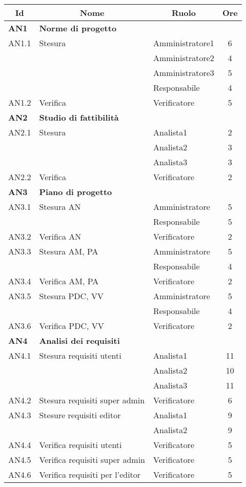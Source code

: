 \begin{table}[H]
	\centering
	\begin{tabular}{ l l l c  }
	\hline
	\multicolumn{1}{c}{\textbf{Id}} & 
	\multicolumn{1}{c}{\textbf{Nome}} & 
	\multicolumn{1}{c}{\textbf{Ruolo}}& 
	\multicolumn{1}{c}{\textbf{Ore}} \\
	\hline
	
	\textbf{AN1} & \textbf{Norme di progetto} \\
	\cline{3-4}
	AN1.1 & Stesura & Amministratore1 & 6\\ 
    & & Amministratore2 & 4\\
    & & Amministratore3 & 5 \\
    & & Responsabile & 4 \\
    \cline{3-4}
	AN1.2 & Verifica & Verificatore &  5\\
	
	\hline
	\textbf{AN2} & \textbf{Studio di fattibilità} \\
	\cline{3-4}
	AN2.1 & Stesura & Analista1 & 2\\ 
    & & Analista2 & 3\\
    & & Analista3 & 3 \\
    \cline{3-4}
	AN2.2 & Verifica & Verificatore &  2\\
	
	\hline
	\textbf{AN3} & \textbf{Piano di progetto} \\
	\cline{3-4}
	AN3.1 & Stesura AN & Amministratore & 5\\ 
    & & Responsabile & 5\\
    \cline{3-4}
	AN3.2 & Verifica AN & Verificatore &  2\\
	\cline{3-4}
	AN3.3 & Stesura AM, PA & Amministratore & 5\\ 
    & & Responsabile & 4\\
	\cline{3-4}
	AN3.4 & Verifica AM, PA & Verificatore &  2\\
	\cline{3-4}
	AN3.5 & Stesura PDC, VV & Amministratore & 5\\ 
        & & Responsabile & 4\\
	\cline{3-4}
	AN3.6 & Verifica PDC, VV & Verificatore &  2\\
	

	\hline
	\textbf{AN4} & \textbf{Analisi dei requisiti} \\
	\cline{3-4}
	AN4.1 & Stesura requisiti utenti & Analista1 & 11\\ 
    & & Analista2 & 10\\
    & & Analista3 & 11\\
    \cline{3-4}
	AN4.2 & Stesura requisiti super admin & Verificatore &  6\\
	\cline{3-4}
	AN4.3 & Stesure requisiti editor & Analista1 & 9\\ 
    & & Analista2 & 9\\
	\cline{3-4}
	AN4.4 & Verifica requisiti utenti & Verificatore &  5\\
        \cline{3-4}
        AN4.5 & Verifica requisiti super admin & Verificatore &  5\\
        \cline{3-4}
        AN4.6 & Verifica requisiti per l'editor & Verificatore &  5\\


\end{tabular}
\end{table}
